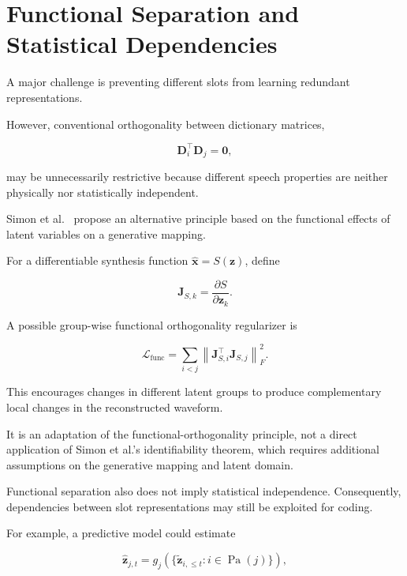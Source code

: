 \documentclass{article}
\begin{document}
\section{Functional Separation and Statistical Dependencies}

A major challenge is preventing different slots
from learning redundant representations.

However, conventional orthogonality between
dictionary matrices,

\begin{equation}
    \mathbf{D}_i^\top\mathbf{D}_j=\mathbf{0},
\end{equation}

may be unnecessarily restrictive because
different speech properties are neither physically
nor statistically independent.

Simon et al.~\cite{simon2026} propose an alternative
principle based on the functional effects of
latent variables on a generative mapping.

For a differentiable synthesis function
$\hat{\mathbf{x}}=S(\mathbf{z})$, define

\begin{equation}
    \mathbf{J}_{S,k}
    =
    \frac{\partial S}{\partial\mathbf{z}_k}.
\end{equation}

A possible group-wise functional orthogonality
regularizer is

\begin{equation}
    \boxed{
    \mathcal{L}_{\mathrm{func}}
    =
    \sum_{i<j}
    \left\|
    \mathbf{J}_{S,i}^{\top}
    \mathbf{J}_{S,j}
    \right\|_F^2.
    }
\end{equation}

This encourages changes in different latent groups
to produce complementary local changes in the
reconstructed waveform.

It is an adaptation of the functional-orthogonality
principle, not a direct application of Simon et al.'s
identifiability theorem, which requires additional
assumptions on the generative mapping and latent domain.

Functional separation also does not imply statistical
independence. Consequently, dependencies between
slot representations may still be exploited for coding.

For example, a predictive model could estimate

\begin{equation}
    \hat{\mathbf{z}}_{j,t}
    =
    g_j\left(
    \{\tilde{\mathbf{z}}_{i,\leq t}:
    i\in\operatorname{Pa}(j)\}
    \right),
\end{equation}
\end{document}
